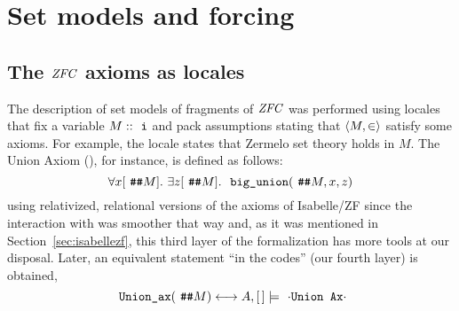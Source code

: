 \section{Set models and forcing}
\label{sec:forcing}

\subsection{The $\mathit{ZFC}$ axioms as locales}\label{sec:zfc-axioms-as-locales}
The description of set models of fragments of $\mathit{ZFC}$ was performed
using locales that fix a variable $M::\tyi$
and pack assumptions stating that $\langle M, \in\rangle$ satisfy some
axioms. For example, the locale 
states that Zermelo set theory holds in $M$. The Union Axiom (), for
instance, is defined as follows:
\[
\forall x[\isatt{\#\#}M].\ \exists z[\isatt{\#\#}M].\ \isatt{big{\uscore}union}(\isatt{\#\#}M,x,z)
\]
using relativized, relational versions of the axioms of Isabelle/ZF
since the interaction with  was smoother
that way and, as it was mentioned in Section~\ref{sec:isabellezf},
this third layer of the formalization has more tools at our
disposal. Later, an equivalent statement “in the codes” (our fourth
layer) is obtained,
\[
  \isatt{Union{\uscore}ax}(\isatt{\#\#}M) \lsii A, [\,]\models \isatt{{\isasymcdot}Union\ Ax{\isasymcdot}}
\]
